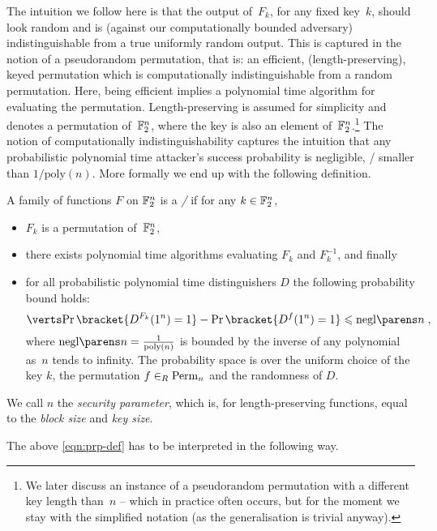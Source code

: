 The intuition we follow here is that the output of~$F_k$, for any fixed key~$k$, should look random and is (against our computationally bounded adversary) indistinguishable from a true uniformly random output.
This is captured in the notion of a pseudorandom permutation, that is: an efficient, (length-preserving), keyed permutation which is computationally indistinguishable from a random permutation.
Here, being efficient implies a polynomial time algorithm for evaluating the permutation.
Length-preserving is assumed for simplicity and denotes a permutation of~$\mathbb{F}_2^n$, where the key is also an element of~$\mathbb{F}_2^n$.\footnote{%
    We later discuss an instance of a pseudorandom permutation with a different key length than~$n$ -- which in practice often occurs, but for the moment we stay with the simplified notation (as the generalisation is trivial anyway).
}
The notion of computationally indistinguishability captures the intuition that any probabilistic polynomial time attacker's success probability is negligible, \ie/ smaller than $1/\mathrm{poly}(n)$.
More formally we end up with the following definition.
\begin{definition}\label{def:prp}
    A family of functions $F$ on $\mathbb{F}_2^n$ is a \emph{\PRP/} if for any $k \in \mathbb{F}_2^n$,
    \begin{itemize}
        \item $F_k$ is a permutation of~$\mathbb{F}_2^n$,
        \item there exists polynomial time algorithms evaluating $F_k$ and $F_k^{-1}$, and finally
        \item for all probabilistic polynomial time distinguishers $D$ the following probability bound holds:
              \begin{equation}\label{eqn:prp-def}
                  \abs{\Prob\bracket{D^{F_k}(1^n) = 1} - \Prob\bracket{D^{f}(1^n) = 1}} \leqslant \negl{n}\;,
              \end{equation}
              where $\negl{n} = \frac{1}{\mathrm{poly}(n)}$ is bounded by the inverse of any polynomial as~$n$ tends to infinity.
              The probability space is over the uniform choice of the key $k$, the permutation $f \in_R \perm/_n$ and the randomness of $D$.
    \end{itemize}
    We call $n$ the \emph{security parameter}, which is, for length-preserving functions, equal to the \emph{block size} and \emph{key size}.
\end{definition}
The above \cref{eqn:prp-def} has to be interpreted in the following way.

